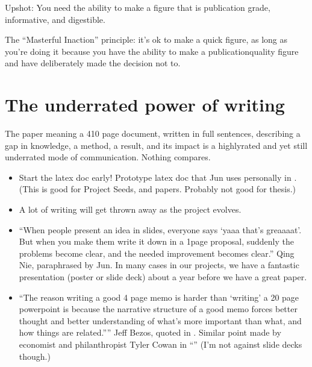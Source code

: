 \documentclass[letterpaper,10pt,english]{sphinxmanual}
\begin{document}
\sphinxAtStartPar
Upshot: You need the ability to make a figure that is publication grade, informative, and digestible. 

\sphinxAtStartPar
The “Masterful Inaction” principle: it’s ok to make a quick figure, as long as you’re doing it because you have the ability to make a publication\sphinxhyphen{}quality figure and have deliberately made the decision not to.


\section{The under\sphinxhyphen{}rated power of writing}
\label{\detokenize{02Elements:the-under-rated-power-of-writing}}
\sphinxAtStartPar
The paper \sphinxhyphen{} meaning a 4\sphinxhyphen{}10 page document, written in full sentences, describing a gap in knowledge, a method, a result, and its impact \sphinxhyphen{} is a highly\sphinxhyphen{}rated and yet still under\sphinxhyphen{}rated mode of communication. Nothing compares.
\begin{itemize}
\item {} 
\sphinxAtStartPar
Start the latex doc early! Prototype latex doc that Jun uses personally in . (This is good for Project Seeds, and papers. Probably not good for thesis.)

\item {} 
\sphinxAtStartPar
A lot of writing will get thrown away as the project evolves. 

\item {} 
\sphinxAtStartPar
“When people present an idea in slides, everyone says ‘yaaa that’s greaaaat’. But when you make them write it down in a 1\sphinxhyphen{}page proposal, suddenly the problems become clear, and the needed improvement becomes clear.” \sphinxhyphen{} Qing Nie, paraphrased by Jun.  In many cases in our projects, we have a fantastic presentation (poster or slide deck) about a year before we have a great paper.

\item {} 
\sphinxAtStartPar
“The reason writing a good 4 page memo is harder than ‘writing’ a 20 page powerpoint is because the narrative structure of a good memo forces better thought and better understanding of what’s more important than what, and how things are related.”” Jeff Bezos, quoted in . Similar point made by economist and philanthropist Tyler Cowan in “” (I’m not against slide decks though.)

\end{itemize}
\end{document}
